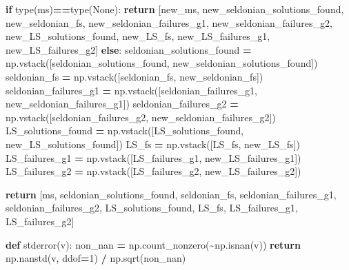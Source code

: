 \documentclass[12pt, twoside]{amherstthesis}
\newenvironment{Shaded}{\begin{snugshade}}{\end{snugshade}}
\newcommand{\BuiltInTok}[1]{#1}
\newcommand{\ControlFlowTok}[1]{\textcolor[rgb]{0.13,0.29,0.53}{\textbf{#1}}}
\newcommand{\DecValTok}[1]{\textcolor[rgb]{0.00,0.00,0.81}{#1}}
\newcommand{\KeywordTok}[1]{\textcolor[rgb]{0.13,0.29,0.53}{\textbf{#1}}}
\newcommand{\NormalTok}[1]{#1}
\newcommand{\OperatorTok}[1]{\textcolor[rgb]{0.81,0.36,0.00}{\textbf{#1}}}
\newcommand{\VariableTok}[1]{\textcolor[rgb]{0.00,0.00,0.00}{#1}}
\begin{document}
\begin{Shaded}
\begin{Highlighting}[]
    \ControlFlowTok{if} \BuiltInTok{type}\NormalTok{(ms)}\OperatorTok{==}\BuiltInTok{type}\NormalTok{(}\VariableTok{None}\NormalTok{):}
        \ControlFlowTok{return}\NormalTok{ [new\_ms, new\_seldonian\_solutions\_found, new\_seldonian\_fs,}
\NormalTok{      new\_seldonian\_failures\_g1, new\_seldonian\_failures\_g2,}
\NormalTok{      new\_LS\_solutions\_found, new\_LS\_fs, new\_LS\_failures\_g1, }
\NormalTok{      new\_LS\_failures\_g2]}
    \ControlFlowTok{else}\NormalTok{:}
\NormalTok{        seldonian\_solutions\_found  }\OperatorTok{=} 
\NormalTok{        np.vstack([seldonian\_solutions\_found, new\_seldonian\_solutions\_found])}
\NormalTok{        seldonian\_fs               }\OperatorTok{=} 
\NormalTok{        np.vstack([seldonian\_fs,              new\_seldonian\_fs])}
\NormalTok{        seldonian\_failures\_g1      }\OperatorTok{=} 
\NormalTok{        np.vstack([seldonian\_failures\_g1,     new\_seldonian\_failures\_g1])}
\NormalTok{        seldonian\_failures\_g2      }\OperatorTok{=} 
\NormalTok{        np.vstack([seldonian\_failures\_g2,     new\_seldonian\_failures\_g2])}
\NormalTok{        LS\_solutions\_found         }\OperatorTok{=} 
\NormalTok{        np.vstack([LS\_solutions\_found,        new\_LS\_solutions\_found])}
\NormalTok{        LS\_fs                      }\OperatorTok{=} 
\NormalTok{        np.vstack([LS\_fs,                     new\_LS\_fs])}
\NormalTok{        LS\_failures\_g1             }\OperatorTok{=} 
\NormalTok{        np.vstack([LS\_failures\_g1,            new\_LS\_failures\_g1])}
\NormalTok{        LS\_failures\_g2             }\OperatorTok{=} 
\NormalTok{        np.vstack([LS\_failures\_g2,            new\_LS\_failures\_g2])}

        \ControlFlowTok{return}\NormalTok{ [ms, seldonian\_solutions\_found, seldonian\_fs, }
\NormalTok{        seldonian\_failures\_g1, seldonian\_failures\_g2, LS\_solutions\_found, }
\NormalTok{        LS\_fs, LS\_failures\_g1, LS\_failures\_g2]}
\end{Highlighting}
\end{Shaded}
\begin{Shaded}
\begin{Highlighting}[]
\KeywordTok{def}\NormalTok{ stderror(v):}
\NormalTok{    non\_nan }\OperatorTok{=}\NormalTok{ np.count\_nonzero(}\OperatorTok{\textasciitilde{}}\NormalTok{np.isnan(v))        }
    \ControlFlowTok{return}\NormalTok{ np.nanstd(v, ddof}\OperatorTok{=}\DecValTok{1}\NormalTok{) }\OperatorTok{/}\NormalTok{ np.sqrt(non\_nan)}
\end{Highlighting}
\end{Shaded}
\end{document}
